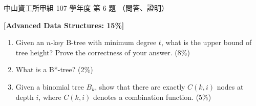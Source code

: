 \begin{pastexam}[label={px:nsysu-107-osds-02}]{中山資工所甲組 107 學年度 第 6 題}
（問答、證明）

\textbf{[Advanced Data Structures: 15\%]}
\begin{enumerate}[label=(\arabic*)]
\item Given an $n$-key B-tree with minimum degree $t$, what is the upper bound of tree height?
Prove the correctness of your answer. (8\%)
\item What is a B*-tree? (2\%)
\item Given a binomial tree $B_k$, show that there are exactly $C(k, i)$ nodes at depth $i$, where
$C(k, i)$ denotes a combination function. (5\%)
\end{enumerate}
\end{pastexam}

